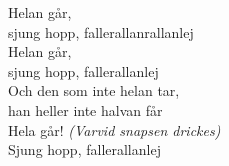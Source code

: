 \vspace{10pt}
Helan går,\\
sjung hopp, fallerallanrallanlej\\
Helan går,\\
sjung hopp, fallerallanlej\\
Och den som inte helan tar,\\
han heller inte halvan får\\
Hela går! \textit{(Varvid snapsen drickes)}\\
Sjung hopp, fallerallanlej
